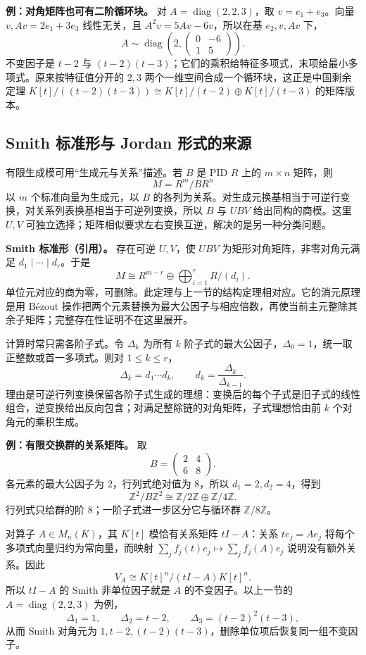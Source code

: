 \documentclass[UTF8,12pt,a4paper,fontset=fandol]{ctexart}
\begin{document}
\textbf{例：对角矩阵也可有二阶循环块。} 对 $A=\operatorname{diag}(2,2,3)$，取 $v=e_1+e_3$。向量 $v,Av=2e_1+3e_3$ 线性无关，且 $A^2v=5Av-6v$，所以在基 $e_2,v,Av$ 下，
\[
A\sim\operatorname{diag}\!\left(2,
\begin{pmatrix}0&-6\\1&5\end{pmatrix}\right).
\]
不变因子是 $t-2$ 与 $(t-2)(t-3)$；它们的乘积给特征多项式，末项给最小多项式。原来按特征值分开的 $2,3$ 两个一维空间合成一个循环块，这正是中国剩余定理 $K[t]/((t-2)(t-3))\cong K[t]/(t-2)\oplus K[t]/(t-3)$ 的矩阵版本。

\subsection{Smith 标准形与 Jordan 形式的来源}

\label{app:algebra-smith}

有限生成模可用“生成元与关系”描述。若 $B$ 是 PID $R$ 上的 $m\times n$ 矩阵，则
\[
M=R^m/B R^n
\]
以 $m$ 个标准向量为生成元，以 $B$ 的各列为关系。对生成元换基相当于可逆行变换，对关系列表换基相当于可逆列变换，所以 $B$ 与 $UBV$ 给出同构的商模。这里 $U,V$ 可独立选择；矩阵相似要求左右变换互逆，解决的是另一种分类问题。

\textbf{Smith 标准形（引用）。} 存在可逆 $U,V$，使 $UBV$ 为矩形对角矩阵，非零对角元满足 $d_1\mid\cdots\mid d_r$。于是
\[
M\cong R^{m-r}\oplus\bigoplus_{i=1}^r R/(d_i).
\]
单位元对应的商为零，可删除。此定理与上一节的结构定理相对应。它的消元原理是用 Bézout 操作把两个元素替换为最大公因子与相应倍数，再使当前主元整除其余子矩阵；完整存在性证明不在这里展开。

计算时常只需各阶子式。令 $\Delta_k$ 为所有 $k$ 阶子式的最大公因子，$\Delta_0=1$，统一取正整数或首一多项式。则对 $1\le k\le r$，
\[
\Delta_k=d_1\cdots d_k,
\qquad d_k=\frac{\Delta_k}{\Delta_{k-1}}.
\]
理由是可逆行列变换保留各阶子式生成的理想：变换后的每个子式是旧子式的线性组合，逆变换给出反向包含；对满足整除链的对角矩阵，子式理想恰由前 $k$ 个对角元的乘积生成。

\textbf{例：有限交换群的关系矩阵。} 取
\[
B=\begin{pmatrix}2&4\\6&8\end{pmatrix}.
\]
各元素的最大公因子为 $2$，行列式绝对值为 $8$，所以 $d_1=2,d_2=4$，得到
\[
\mathbb Z^2/B\mathbb Z^2\cong\mathbb Z/2\mathbb Z\oplus\mathbb Z/4\mathbb Z.
\]
行列式只给群的阶 $8$；一阶子式进一步区分它与循环群 $\mathbb Z/8\mathbb Z$。

对算子 $A\in M_n(K)$，其 $K[t]$ 模恰有关系矩阵 $tI-A$：关系 $te_j=Ae_j$ 将每个多项式向量归约为常向量，而映射 $\sum_j f_j(t)e_j\mapsto\sum_j f_j(A)e_j$ 说明没有额外关系。因此
\[
V_A\cong K[t]^n/(tI-A)K[t]^n.
\]
所以 $tI-A$ 的 Smith 非单位因子就是 $A$ 的不变因子。以上一节的 $A=\operatorname{diag}(2,2,3)$ 为例，
\[
\Delta_1=1,\qquad\Delta_2=t-2,\qquad
\Delta_3=(t-2)^2(t-3),
\]
从而 Smith 对角元为 $1,t-2,(t-2)(t-3)$，删除单位项后恢复同一组不变因子。
\end{document}
